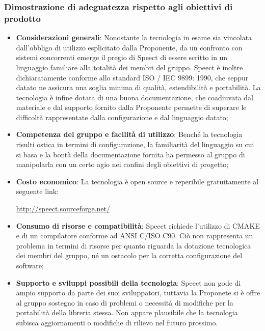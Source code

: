 \documentclass[./../Technology Baseline.tex]{subfiles}
\begin{document}
\subsubsection{Dimostrazione di adeguatezza rispetto agli obiettivi di prodotto}
\begin{itemize}
	\item \textbf{Considerazioni generali}: Nonostante la tecnologia in esame sia vincolata dall'obbligo di utilizzo esplicitato dalla Proponente, da un confronto con sistemi concorrenti emerge il pregio di Speect di essere scritto in un linguaggio familiare alla totalità dei membri del gruppo. Speect è inoltre dichiaratamente conforme allo standard ISO / IEC 9899: 1990, che seppur datato ne assicura una soglia minima di qualità, estendibilità e portabilità. La tecnologia è infine dotata di una buona documentazione, che coadiuvata dal materiale e dal supporto fornito dalla Proponente permette di superare le difficoltà rappresentate dalla configurazione e dal linguaggio datato;
	
	\item \textbf{Competenza del gruppo e facilità di utilizzo}: Benché la tecnologia risulti ostica in termini di configurazione, la familiarità del linguaggio su cui si basa e la bontà della documentazione fornita ha permesso al gruppo di manipolarla con un certo agio nei confini degli obiettivi di progetto;
	
	\item \textbf{Costo economico}: La tecnologia è open source e reperibile gratuitamente al seguente link:
	\begin{center}
		\url{http://speect.sourceforge.net/}
	\end{center}

	\item \textbf{Consumo di risorse e compatibilità}: Speect richiede l'utilizzo di CMAKE e di un compilatore conforme ad ANSI C/ISO C90. Ciò non rappresenta un problema in termini di risorse per quanto riguarda la dotazione tecnologica dei membri del gruppo, né un ostacolo per la corretta configurazione del software;
	
	\item \textbf{Supporto e sviluppi possibili della tecnologia}: Speect non gode di ampio supporto da parte dei suoi sviluppatori, tuttavia la Proponete si è offre al gruppo sostegno in caso di problemi o necessità di modifiche per la portabilità della libreria stessa. Non appare plausibile che la tecnologia subisca aggiornamenti o modifiche di rilievo nel futuro prossimo.
\end{itemize}
\end{document}
